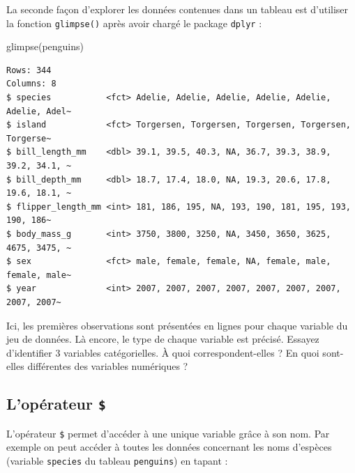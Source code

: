 \documentclass[
  a4paper,
  DIV=11,
  numbers=noendperiod,
  oneside]{scrreprt}
\newenvironment{Shaded}{}{}
\newcommand{\FunctionTok}[1]{\textcolor[rgb]{0.44,0.26,0.76}{#1}}
\newcommand{\NormalTok}[1]{\textcolor[rgb]{0.14,0.16,0.18}{#1}}
\newcommand{\SpecialCharTok}[1]{\textcolor[rgb]{0.00,0.36,0.77}{#1}}
\begin{document}
La seconde façon d'explorer les données contenues dans un tableau est
d'utiliser la fonction \texttt{glimpse()} après avoir chargé le package
\texttt{dplyr} :

\begin{Shaded}
\begin{Highlighting}[]
\FunctionTok{glimpse}\NormalTok{(penguins)}
\end{Highlighting}
\end{Shaded}

\begin{verbatim}
Rows: 344
Columns: 8
$ species           <fct> Adelie, Adelie, Adelie, Adelie, Adelie, Adelie, Adel~
$ island            <fct> Torgersen, Torgersen, Torgersen, Torgersen, Torgerse~
$ bill_length_mm    <dbl> 39.1, 39.5, 40.3, NA, 36.7, 39.3, 38.9, 39.2, 34.1, ~
$ bill_depth_mm     <dbl> 18.7, 17.4, 18.0, NA, 19.3, 20.6, 17.8, 19.6, 18.1, ~
$ flipper_length_mm <int> 181, 186, 195, NA, 193, 190, 181, 195, 193, 190, 186~
$ body_mass_g       <int> 3750, 3800, 3250, NA, 3450, 3650, 3625, 4675, 3475, ~
$ sex               <fct> male, female, female, NA, female, male, female, male~
$ year              <int> 2007, 2007, 2007, 2007, 2007, 2007, 2007, 2007, 2007~
\end{verbatim}

Ici, les premières observations sont présentées en lignes pour chaque
variable du jeu de données. Là encore, le type de chaque variable est
précisé. Essayez d'identifier 3 variables catégorielles. À quoi
correspondent-elles ? En quoi sont-elles différentes des variables
numériques ?

\subsection{\texorpdfstring{L'opérateur
\texttt{\$}}{L'opérateur \$}}\label{lopuxe9rateur}

L'opérateur \texttt{\$} permet d'accéder à une unique variable grâce à
son nom. Par exemple on peut accéder à toutes les données concernant les
noms d'espèces (variable \texttt{species} du tableau \texttt{penguins})
en tapant :

\begin{Shaded}
\end{Shaded}
\end{document}
